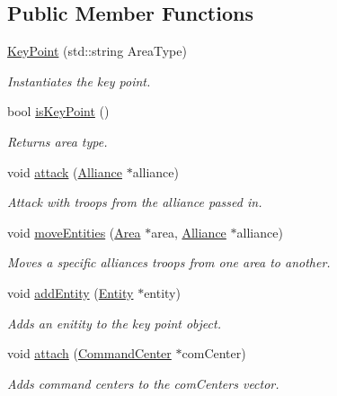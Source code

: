 \subsection*{Public Member Functions}
\begin{DoxyCompactItemize}
\item 
\mbox{\label{classKeyPoint_a6fe8d5def9eebd9ba5a4b9e56a698367}} 
\hyperlink{classKeyPoint_a6fe8d5def9eebd9ba5a4b9e56a698367}{Key\+Point} (std\+::string Area\+Type)
\begin{DoxyCompactList}\small\item\em Instantiates the key point. \end{DoxyCompactList}\item 
bool \hyperlink{classKeyPoint_a1beb436d8efa973f3dc290a722727961}{is\+Key\+Point} ()
\begin{DoxyCompactList}\small\item\em Returns area type. \end{DoxyCompactList}\item 
void \hyperlink{classKeyPoint_a137026380d2907f880bb4c48b30c2d5e}{attack} (\hyperlink{classAlliance}{Alliance} $\ast$alliance)
\begin{DoxyCompactList}\small\item\em Attack with troops from the alliance passed in. \end{DoxyCompactList}\item 
void \hyperlink{classKeyPoint_a3fc425554378989ba83ebd22f7305f14}{move\+Entities} (\hyperlink{classArea}{Area} $\ast$area, \hyperlink{classAlliance}{Alliance} $\ast$alliance)
\begin{DoxyCompactList}\small\item\em Moves a specific alliances troops from one area to another. \end{DoxyCompactList}\item 
void \hyperlink{classKeyPoint_aad6d7102c8e3d11fe5f29b163f50dbc3}{add\+Entity} (\hyperlink{classEntity}{Entity} $\ast$entity)
\begin{DoxyCompactList}\small\item\em Adds an enitity to the key point object. \end{DoxyCompactList}\item 
void \hyperlink{classKeyPoint_a42df3ce6652f1817fc04324ad15a868d}{attach} (\hyperlink{classCommandCenter}{Command\+Center} $\ast$com\+Center)
\begin{DoxyCompactList}\small\item\em Adds command centers to the com\+Centers vector. \end{DoxyCompactList}\item 

\end{DoxyCompactItemize}
